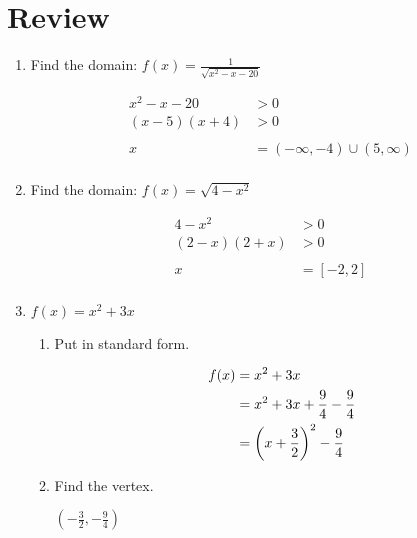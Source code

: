 \documentclass[landscape]{exam}
\begin{document}
  \section{Review}
  \begin{enumerate}
    \item Find the domain: $f(x) = \frac{1}{\sqrt{x^2 - x - 20}}$
      \begin{solution}
        \begin{align*}
          x^2 - x - 20   &> 0 \\
          (x - 5)(x + 4) &> 0 \\
          \\
          x &= \left( -\infty, -4 \right) \cup \left( 5, \infty \right) \\
        \end{align*}
      \end{solution}

    \item Find the domain: $f(x) = \sqrt{4 - x^2}$
      \begin{solution}
        \begin{align*}
          4 - x^2 &> 0 \\
          (2 - x)(2 + x) &> 0 \\
          \\
          x &= [-2, 2] \\
        \end{align*}
      \end{solution}

    \item $f(x) = x^2 + 3x$ 
      \begin{enumerate}[a]
        \item Put in standard form.
          \begin{solution}
            \begin{align*}
              f(x) &= x^2 + 3x \\
              &= x^2 + 3x + \frac{9}{4} - \frac{9}{4} \\
              &= \del{ x + \frac{3}{2} }^2 - \frac{9}{4} \\
            \end{align*}
          \end{solution}

        \item Find the vertex.
          \begin{solution}
            $ \left( -\frac{3}{2}, - \frac{9}{4} \right) $
          \end{solution}


\end{enumerate}
\end{enumerate}
\end{document}
